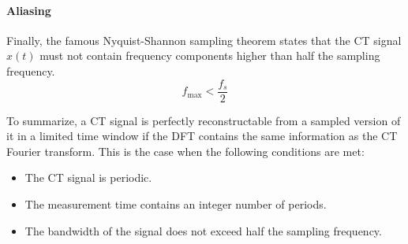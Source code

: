 \paragraph{Aliasing}
Finally, the famous Nyquist-Shannon sampling theorem states that the CT signal $x(t)$ must not contain frequency components higher than half the sampling frequency.
\begin{equation*}
    f_{\mathrm{max}} < \frac{f_s}{2}
\end{equation*}

To summarize, a CT signal is perfectly reconstructable from a sampled version of it in a limited time window if the DFT contains the same information as the CT Fourier transform. This is the case when the following conditions are met:

\begin{itemize}
    \item The CT signal is periodic.
    \item The measurement time contains an integer number of periods.
    \item The bandwidth of the signal does not exceed half the sampling frequency.
\end{itemize}

\newpage
